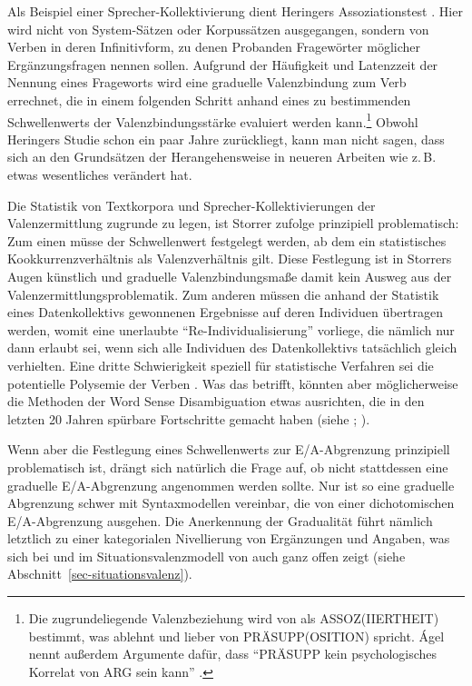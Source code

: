\largerpage
Als Beispiel einer Sprecher-Kollektivierung dient \citet[93ff, 232ff]{Storrer:92} Heringers Assoziationstest \citep{Heringer:85}. Hier wird nicht von System-Sätzen oder Korpussätzen ausgegangen, sondern von Verben in deren Infinitivform, zu denen Probanden Fragewörter möglicher Ergänzungsfragen nennen sollen. Aufgrund der Häufigkeit und Latenzzeit der Nennung eines Frageworts wird eine graduelle Valenzbindung zum Verb errechnet, die in einem folgenden Schritt anhand eines zu bestimmenden Schwellenwerts der Valenzbindungsstärke evaluiert werden kann.\footnote{Die zugrundeliegende Valenzbeziehung wird von \citet[29]{Jacobs:94} als ASSOZ(IIERTHEIT) bestimmt, was \citet[209]{Agel:00} ablehnt und lieber von PRÄSUPP(OSITION) spricht. \'Agel nennt au\ss erdem Argumente dafür, dass "`PRÄSUPP kein psychologisches Korrelat von ARG sein kann"' \citep[210]{Agel:00}.}  Obwohl Heringers Studie schon ein paar Jahre zurückliegt, kann man nicht sagen, dass sich an den Grundsätzen der Herangehensweise in neueren Arbeiten wie z.\,B.\ \cite{SchulteImWalde:08} etwas wesentliches verändert hat.

Die Statistik von Textkorpora und Sprecher-Kollektivierungen der Valenzermittlung zugrunde zu legen, ist Storrer zufolge prinzipiell problematisch: Zum einen müsse der Schwellenwert festgelegt werden, ab dem ein statistisches Kookkurrenzverhältnis als Valenzverhältnis gilt. Diese Festlegung ist in Storrers Augen künstlich und graduelle Valenzbindungsma\ss e damit kein Ausweg aus der Valenzermittlungsproblematik. Zum anderen müssen die anhand der Statistik eines Datenkollektivs gewonnenen Ergebnisse auf deren Individuen übertragen werden, womit eine unerlaubte "`Re-Individualisierung"' \citep[233]{Storrer:92} vorliege, die nämlich nur dann erlaubt sei, wenn sich alle Individuen des Datenkollektivs tatsächlich gleich verhielten. Eine dritte Schwierigkeit speziell für statistische Verfahren sei die potentielle Polysemie der Verben \citep[Fußnote 174]{Storrer:92}. Was das betrifft, könnten aber möglicherweise die Methoden der Word Sense Disambiguation etwas ausrichten, die in den letzten 20 Jahren spürbare Fortschritte gemacht haben (siehe \citealt{McCarthy:09}; \citealt[Kapitel 20]{Jurafsky:Martin:09}).

Wenn aber die Festlegung eines Schwellenwerts zur E/A-Abgrenzung prinzipiell problematisch ist, drängt sich natürlich die Frage auf, ob nicht stattdessen eine graduelle E/A-Abgrenzung angenommen werden sollte. Nur ist so eine graduelle Abgrenzung schwer mit Syntaxmodellen vereinbar, die von einer dichotomischen E/A-Abgrenzung ausgehen. Die Anerkennung der Gradualität führt nämlich letztlich zu einer kategorialen Nivellierung von Ergänzungen und Angaben, was sich bei \cite{Heringer:84} und im Situationsvalenzmodell von \cite{Storrer:92} auch ganz offen zeigt (siehe Abschnitt~\ref{sec-situationsvalenz}).	        


